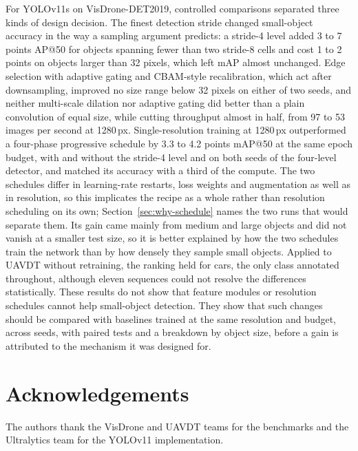 \documentclass[preprint,12pt]{elsarticle}
\begin{document}
For YOLOv11s on VisDrone-DET2019, controlled comparisons separated three kinds of
design decision. The finest detection stride changed small-object accuracy in the
way a sampling argument predicts: a stride-4 level added 3 to 7 points AP@50 for
objects spanning fewer than two stride-8 cells and cost 1 to 2 points on objects
larger than 32 pixels, which left mAP almost unchanged. Edge selection with
adaptive gating and CBAM-style recalibration, which act after downsampling,
improved no size range below 32 pixels on either of two seeds, and neither
multi-scale dilation nor adaptive gating did better than a plain convolution of
equal size, while cutting throughput almost in half, from 97 to 53 images per
second at 1280\,px.
Single-resolution training at 1280\,px outperformed a four-phase
progressive schedule by 3.3 to 4.2 points mAP@50 at the same epoch budget, with and
without the stride-4 level and on both seeds of the four-level detector, and
matched its accuracy with a third of the compute. The two schedules differ in
learning-rate restarts, loss weights and augmentation as well as in resolution, so
this implicates the recipe as a whole rather than resolution scheduling on its own;
Section~\ref{sec:why-schedule} names the two runs that would separate them.
Its gain came mainly from medium and large objects and did not vanish at a smaller
test size, so it is better explained by how the two schedules train the network
than by how densely they sample small objects. Applied to UAVDT without retraining,
the ranking held for cars, the only class annotated throughout, although eleven
sequences could not resolve the differences statistically. These results do not show that feature modules
or resolution schedules cannot help small-object detection. They show that such
changes should be compared with baselines trained at the same resolution and
budget, across seeds, with paired tests and a breakdown by object size, before a
gain is attributed to the mechanism it was designed for.

\section*{Acknowledgements}
The authors thank the VisDrone and UAVDT teams for the benchmarks and the
Ultralytics team for the YOLOv11 implementation.

\appendix
\setcounter{table}{0}
\setcounter{figure}{0}
\end{document}
